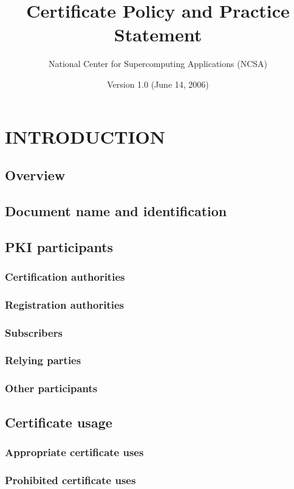 \documentclass[10pt]{article}
\begin{document}
\title{Certificate Policy and Practice Statement}
\author{National Center for Supercomputing Applications (NCSA)}

\date{Version 1.0 (June 14, 2006)}

\maketitle

\section{INTRODUCTION}
\subsection{Overview}
\subsection{Document name and identification}
\subsection{PKI participants}
\subsubsection{Certification authorities}
\subsubsection{Registration authorities}
\subsubsection{Subscribers}
\subsubsection{Relying parties}
\subsubsection{Other participants}
\subsection{Certificate usage}
\subsubsection{Appropriate certificate uses}
\subsubsection{Prohibited certificate uses}
\end{document}

